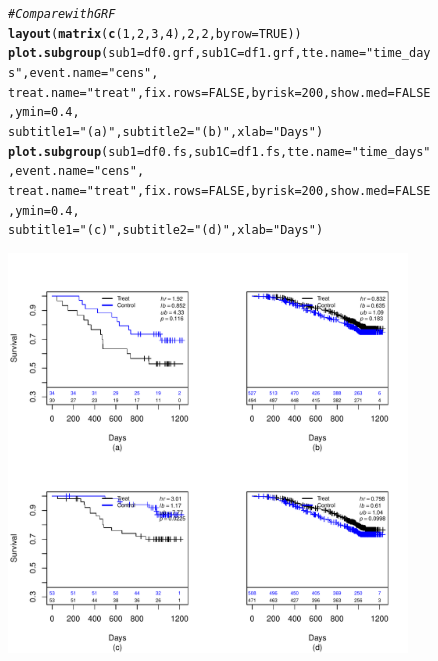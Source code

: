 \documentclass[9pt]{article}\usepackage[]{graphicx}\usepackage[]{xcolor}
\makeatletter
\newcommand{\hlnum}[1]{\textcolor[rgb]{0.686,0.059,0.569}{#1}}%
\newcommand{\hlstr}[1]{\textcolor[rgb]{0.192,0.494,0.8}{#1}}%
\newcommand{\hlcom}[1]{\textcolor[rgb]{0.678,0.584,0.686}{\textit{#1}}}%
\newcommand{\hlstd}[1]{\textcolor[rgb]{0.345,0.345,0.345}{#1}}%
\newcommand{\hlkwc}[1]{\textcolor[rgb]{0.333,0.667,0.333}{#1}}%
\newcommand{\hlkwd}[1]{\textcolor[rgb]{0.737,0.353,0.396}{\textbf{#1}}}%
\newenvironment{kframe}{%
 \def\at@end@of@kframe{}%
 \ifinner\ifhmode%
  \def\at@end@of@kframe{\end{minipage}}%
  \begin{minipage}{\columnwidth}%
 \fi\fi%
 \def\FrameCommand##1{\hskip\@totalleftmargin \hskip-\fboxsep
 \colorbox{shadecolor}{##1}\hskip-\fboxsep
     \hskip-\linewidth \hskip-\@totalleftmargin \hskip\columnwidth}%
 \MakeFramed {\advance\hsize-\width
   \@totalleftmargin\z@ \linewidth\hsize
   \@setminipage}}%
 {\par\unskip\endMakeFramed%
 \at@end@of@kframe}
\newenvironment{knitrout}{}{} %
\theoremstyle{definition}
\theoremstyle{remark}
\makeatother
\begin{document}
\begin{figure}[h!]
\begin{center}
\begin{knitrout}
\color{fgcolor}\begin{kframe}
\begin{alltt}
\hlcom{# Compare with GRF}
\hlkwd{layout}\hlstd{(}\hlkwd{matrix}\hlstd{(}\hlkwd{c}\hlstd{(}\hlnum{1}\hlstd{,} \hlnum{2}\hlstd{,} \hlnum{3}\hlstd{,} \hlnum{4}\hlstd{),} \hlnum{2}\hlstd{,} \hlnum{2}\hlstd{,} \hlkwc{byrow} \hlstd{=} \hlnum{TRUE}\hlstd{))}
\hlkwd{plot.subgroup}\hlstd{(}\hlkwc{sub1} \hlstd{= df0.grf,} \hlkwc{sub1C} \hlstd{= df1.grf,} \hlkwc{tte.name} \hlstd{=} \hlstr{"time_days"}\hlstd{,} \hlkwc{event.name} \hlstd{=} \hlstr{"cens"}\hlstd{,}
    \hlkwc{treat.name} \hlstd{=} \hlstr{"treat"}\hlstd{,} \hlkwc{fix.rows} \hlstd{=} \hlnum{FALSE}\hlstd{,} \hlkwc{byrisk} \hlstd{=} \hlnum{200}\hlstd{,} \hlkwc{show.med} \hlstd{=} \hlnum{FALSE}\hlstd{,} \hlkwc{ymin} \hlstd{=} \hlnum{0.4}\hlstd{,}
    \hlkwc{subtitle1} \hlstd{=} \hlstr{"(a)"}\hlstd{,} \hlkwc{subtitle2} \hlstd{=} \hlstr{"(b)"}\hlstd{,} \hlkwc{xlab} \hlstd{=} \hlstr{"Days"}\hlstd{)}
\hlkwd{plot.subgroup}\hlstd{(}\hlkwc{sub1} \hlstd{= df0.fs,} \hlkwc{sub1C} \hlstd{= df1.fs,} \hlkwc{tte.name} \hlstd{=} \hlstr{"time_days"}\hlstd{,} \hlkwc{event.name} \hlstd{=} \hlstr{"cens"}\hlstd{,}
    \hlkwc{treat.name} \hlstd{=} \hlstr{"treat"}\hlstd{,} \hlkwc{fix.rows} \hlstd{=} \hlnum{FALSE}\hlstd{,} \hlkwc{byrisk} \hlstd{=} \hlnum{200}\hlstd{,} \hlkwc{show.med} \hlstd{=} \hlnum{FALSE}\hlstd{,} \hlkwc{ymin} \hlstd{=} \hlnum{0.4}\hlstd{,}
    \hlkwc{subtitle1} \hlstd{=} \hlstr{"(c)"}\hlstd{,} \hlkwc{subtitle2} \hlstd{=} \hlstr{"(d)"}\hlstd{,} \hlkwc{xlab} \hlstd{=} \hlstr{"Days"}\hlstd{)}
\end{alltt}
\end{kframe}
\includegraphics[width=400px,height=400px]{figure/ACTG_2v3_grf-fs_sg-1} 
\end{knitrout}
\end{center}
\end{figure}
\end{document}
